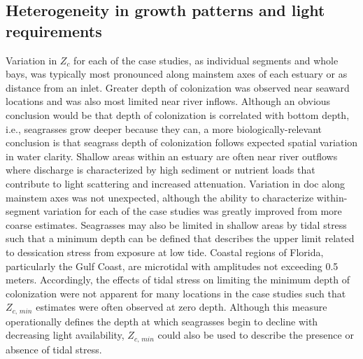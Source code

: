 \documentclass[letterpaper,12pt,oneside]{article}\usepackage[]{graphicx}\usepackage[]{color}
\begin{document}
\subsection{Heterogeneity in growth patterns and light requirements}

Variation in $Z_c$ for each of the case studies, as individual segments and whole bays, was typically most pronounced along mainstem axes of each estuary or as distance from an inlet.  Greater depth of colonization was observed near seaward locations and was also most limited near river inflows.  Although an obvious conclusion would be that depth of colonization is correlated with bottom depth, i.e., seagrasses grow deeper because they can, a more biologically-relevant conclusion is that seagrass depth of colonization follows expected spatial variation in water clarity.  Shallow areas within an estuary are often near river outflows where discharge is characterized by high sediment or nutrient loads that contribute to light scattering and increased attenuation.  Variation in \ac{doc} along mainstem axes was not unexpected, although the ability to characterize within-segment variation for each of the case studies was greatly improved from more coarse estimates.  Seagrasses may also be limited in shallow areas by tidal stress such that a minimum depth can be defined that describes the upper limit related to dessication stress from exposure at low tide.  Coastal regions of Florida, particularly the Gulf Coast, are microtidal with amplitudes not exceeding 0.5 meters.  Accordingly, the effects of tidal stress on limiting the minimum depth of colonization were not apparent for many locations in the case studies such that $Z_{c,\,min}$ estimates were often observed at zero depth.  Although this measure operationally defines the depth at which seagrasses begin to decline with decreasing light availability, $Z_{c,\,min}$ could also be used to describe the presence or absence of tidal stress.

\end{document}

